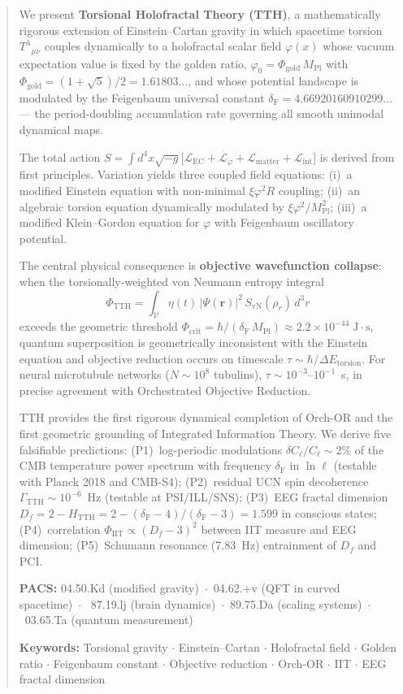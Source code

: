 \documentclass[12pt,a4paper]{article}
\newcommand{\MPl}{M_{\mathrm{Pl}}}
\newcommand{\phicrit}{\Phi_{\mathrm{crit}}}
\newcommand{\phiTTH}{\Phi_{\mathrm{TTH}}}
\newcommand{\tors}{T^{\lambda}{}_{\mu\nu}}
\newcommand{\Feig}{\delta_{\mathrm{F}}}
\newcommand{\SvN}{S_{\mathrm{vN}}}
\newcommand{\etacoupl}{\eta(t)}
\numberwithin{equation}{section}
\begin{document}
\begin{abstract}
\noindent
We present \textbf{Torsional Holofractal Theory (TTH)}, a mathematically rigorous extension
of Einstein--Cartan gravity in which spacetime torsion $\tors$ couples dynamically to a
holofractal scalar field $\varphi(x)$ whose vacuum expectation value is fixed by the golden
ratio, $\varphi_0 = \Phi_{\mathrm{gold}}\,\MPl$ with
$\Phi_{\mathrm{gold}} = (1+\sqrt{5})/2 = 1.61803\ldots$, and whose potential landscape is
modulated by the Feigenbaum universal constant
$\Feig = 4.66920160910299\ldots$ --- the period-doubling accumulation rate governing all
smooth unimodal dynamical maps.

The total action
$S = \int d^4x\sqrt{-g}\bigl[\mathcal{L}_{\mathrm{EC}}
+\mathcal{L}_\varphi+\mathcal{L}_{\mathrm{matter}}
+\mathcal{L}_{\mathrm{int}}\bigr]$
is derived from first principles.
Variation yields three coupled field equations:
(i)~a modified Einstein equation with non-minimal $\xi\varphi^2 R$ coupling;
(ii)~an algebraic torsion equation dynamically modulated by $\xi\varphi^2/\MPl^2$;
(iii)~a modified Klein--Gordon equation for $\varphi$ with Feigenbaum oscillatory potential.

The central physical consequence is \textbf{objective wavefunction collapse}:
when the torsionally-weighted von Neumann entropy integral
\[
  \phiTTH = \int_{\mathcal{V}} \etacoupl\,|\Psi(\mathbf{r})|^2\,\SvN(\rho_r)\,d^3r
\]
exceeds the geometric threshold
$\phicrit = \hbar/(\Feig\,\MPl) \approx 2.2\times10^{-44}\;\mathrm{J\cdot s}$,
quantum superposition is geometrically inconsistent with the Einstein equation
and objective reduction occurs on timescale
$\tau \sim \hbar/\Delta E_{\mathrm{torsion}}$.
For neural microtubule networks ($N \sim 10^8$ tubulins), $\tau \sim 10^{-3}$--$10^{-1}$~s,
in precise agreement with Orchestrated Objective Reduction.

TTH provides the first rigorous dynamical completion of Orch-OR and the first
geometric grounding of Integrated Information Theory.
We derive five falsifiable predictions:
(P1)~log-periodic modulations $\delta C_\ell/C_\ell \sim 2\%$ of the CMB temperature power
spectrum with frequency $\Feig$ in $\ln\ell$ (testable with Planck 2018 and CMB-S4);
(P2)~residual UCN spin decoherence $\Gamma_{\mathrm{TTH}} \sim 10^{-6}$~Hz
(testable at PSI/ILL/SNS);
(P3)~EEG fractal dimension
$D_f = 2 - H_{\mathrm{TTH}} = 2 - (\Feig-4)/(\Feig-3) = 1.599$ in conscious states;
(P4)~correlation $\Phi_{\mathrm{IIT}} \propto (D_f-3)^2$ between IIT measure and EEG
dimension; (P5)~Schumann resonance (7.83~Hz) entrainment of $D_f$ and PCI.

\medskip
\noindent\textbf{PACS:}
04.50.Kd (modified gravity)~$\cdot$~04.62.+v (QFT in curved spacetime)~$\cdot$~
87.19.lj (brain dynamics)~$\cdot$~89.75.Da (scaling systems)~$\cdot$~03.65.Ta (quantum measurement)

\noindent\textbf{Keywords:}
Torsional gravity $\cdot$ Einstein--Cartan $\cdot$ Holofractal field $\cdot$ Golden ratio $\cdot$
Feigenbaum constant $\cdot$ Objective reduction $\cdot$ Orch-OR $\cdot$ IIT $\cdot$ EEG fractal dimension
\end{abstract}
\end{document}
